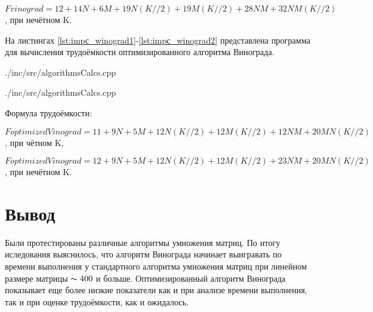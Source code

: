 $Fvinograd = 12+14N+6M+19N(K//2)+19M(K//2)+28NM+32NM(K//2)$,  при нечётном K.

На листингах \ref{lst:impс_winograd1}-\ref{lst:impс_winograd2} представлена программа для вычисления трудоёмкости оптимизированного алгоритма Винограда.

\begin{lstinputlisting}[
	caption={Вычисление трудоёмкости оптимизированного алгоритма Винограда, часть 1},
	label={lst:impс_winograd1},
	style={c},
	linerange={102-142},
	]{./inc/src/algorithmsCalcs.cpp}
\end{lstinputlisting}

\begin{lstinputlisting}[
	caption={Вычисление трудоёмкости оптимизированного алгоритма Винограда, часть 2},
	label={lst:impс_winograd2},
	style={c},
	linerange={144-172},
	]{./inc/src/algorithmsCalcs.cpp}
\end{lstinputlisting}

Формула трудоёмкости:

$FoptimizedVinograd = 11+9N+5M+12N(K//2)+12M(K//2)+12NM+20MN(K//2)$,  при чётном K,

$FoptimizedVinograd = 12+9N+5M+12N(K//2)+12M(K//2)+23NM+20MN(K//2)$,  при нечётном K.

\section{Вывод}
Были протестированы различные алгоритмы умножения матриц. По итогу иследования выяснилось, что алгоритм Винограда начинает выигравать по времени выполнения у стандартного алгоритма умножения матриц при линейном размере матрицы $\thicksim400$ и больше. Оптимизированный алгоритм Винограда показывает еще более низкие показатели как и при анализе времени выполнения, так и при оценке трудоёмкости, как и ожидалось.
